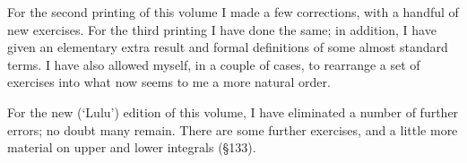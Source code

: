 

\medskip



\bigskip


\medskip

For the second printing of this volume I made a few corrections, with a
handful of new exercises.   For the third printing I have done the same;
in addition, I have given an elementary extra result and formal
definitions of some almost standard terms.   I have also allowed myself,
in a couple of cases, to rearrange a set of exercises into what now
seems to me a more natural order.

\bigskip


\medskip

For the new (`Lulu') edition of this volume, I have eliminated a number of
further errors;  no doubt many remain.   There are some further exercises,
and a little more material on upper and lower integrals (\S133).

